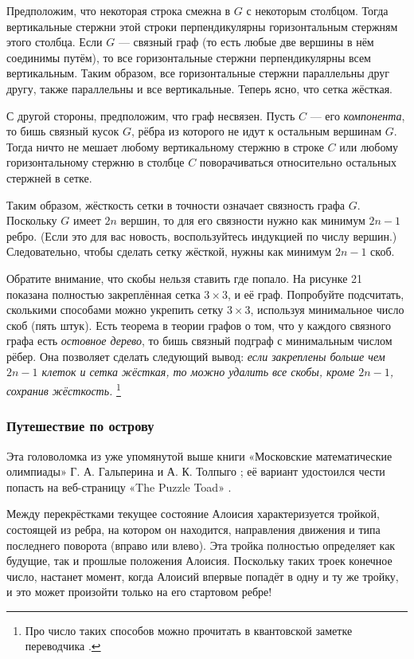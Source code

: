 Предположим, что некоторая строка смежна в $G$ с некоторым столбцом.
Тогда вертикальные стержни этой строки перпендикулярны горизонтальным стержням этого столбца.
Если $G$ --- связный граф (то есть любые две вершины в нём соединимы путём), то все горизонтальные стержни перпендикулярны всем вертикальным.
Таким образом, все горизонтальные стержни параллельны друг другу,
также параллельны и все вертикальные.
Теперь ясно, что сетка жёсткая.

С другой стороны, предположим, что граф несвязен.
Пусть $C$ --- его \emph{компонента}, то бишь связный кусок $G$, рёбра из которого не идут к остальным вершинам $G$.
Тогда ничто не мешает любому вертикальному стержню в строке $C$ или любому горизонтальному стержню в столбце $C$ поворачиваться относительно остальных стержней в сетке.

Таким образом, жёсткость сетки в точности означает связность графа $G$.
Поскольку $G$ имеет $2n$ вершин, то для его связности нужно как минимум $2n - 1$ ребро.
(Если это для вас новость, воспользуйтесь индукцией по числу вершин.)
Следовательно, чтобы сделать сетку жёсткой, нужны как минимум $2n - 1$ скоб.

Обратите внимание, что скобы нельзя ставить где попало.
На рисунке 21 показана полностью закреплённая сетка $3 \times 3$, и её граф.
Попробуйте подсчитать, сколькими способами можно укрепить сетку $3 \times 3$, используя минимальное число скоб  (пять штук).
Есть теорема в теории графов о том, что у каждого связного графа есть \emph{остовное дерево}, то бишь связный подграф с минимальным числом рёбер.
Она позволяет сделать следующий вывод: \emph{если закреплены больше чем $2n - 1$ клеток и сетка жёсткая, то можно удалить все скобы, кроме $2n - 1$, сохранив жёсткость.}%
\footnote{Про число таких способов можно прочитать в квантовской заметке переводчика \cite{petrunin-2018}. \pr}

\subsubsection*{Путешествие по острову}

Эта головоломка из уже упомянутой выше книги «Московские математические олимпиады» Г. А. Гальперина и А. К. Толпыго \cite{23}; её вариант удостоился чести попасть на веб-страницу «The Puzzle Toad» \cite{bohman-pikhurko-frieze-sleator}.

Между перекрёстками текущее состояние Алоисия характеризуется тройкой, состоящей из ребра, на котором он находится, направления движения и типа последнего поворота (вправо или влево).
Эта тройка полностью определяет как будущие, так и прошлые положения Алоисия.
Поскольку таких троек конечное число, настанет момент, когда Алоисий впервые попадёт в одну и ту же тройку, и это может произойти только на его стартовом ребре!


